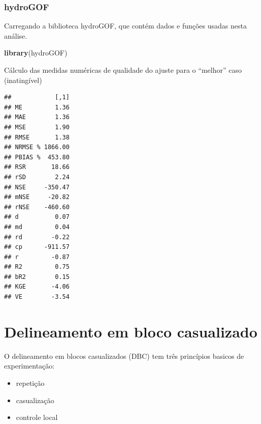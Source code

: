 \documentclass[
]{book}
\newenvironment{Shaded}{\begin{snugshade}}{\end{snugshade}}
\newcommand{\DataTypeTok}[1]{\textcolor[rgb]{0.13,0.29,0.53}{#1}}
\newcommand{\KeywordTok}[1]{\textcolor[rgb]{0.13,0.29,0.53}{\textbf{#1}}}
\newcommand{\NormalTok}[1]{#1}
\newcommand{\OperatorTok}[1]{\textcolor[rgb]{0.81,0.36,0.00}{\textbf{#1}}}
\begin{document}
\hypertarget{hydrogof}{%
\subsection{hydroGOF}\label{hydrogof}}

Carregando a biblioteca hydroGOF, que contém dados e funções usadas nesta análise.

\begin{Shaded}
\begin{Highlighting}[]
\KeywordTok{library}\NormalTok{(hydroGOF)}
\end{Highlighting}
\end{Shaded}

Cálculo das medidas numéricas de qualidade do ajuste para o ``melhor'' caso (inatingível)

\begin{Shaded}
\end{Shaded}

\begin{verbatim}
##            [,1]
## ME         1.36
## MAE        1.36
## MSE        1.90
## RMSE       1.38
## NRMSE % 1866.00
## PBIAS %  453.80
## RSR       18.66
## rSD        2.24
## NSE     -350.47
## mNSE     -20.82
## rNSE    -460.60
## d          0.07
## md         0.04
## rd        -0.22
## cp      -911.57
## r         -0.87
## R2         0.75
## bR2        0.15
## KGE       -4.06
## VE        -3.54
\end{verbatim}

\hypertarget{delineamento-em-bloco-casualizado}{%
\chapter{Delineamento em bloco casualizado}\label{delineamento-em-bloco-casualizado}}

O delineamento em blocos casualizados (DBC) tem três princípios basicos de experimentação:

\begin{itemize}
\item
  repetição
\item
  casualização
\item
  controle local
\end{itemize}
\end{document}
